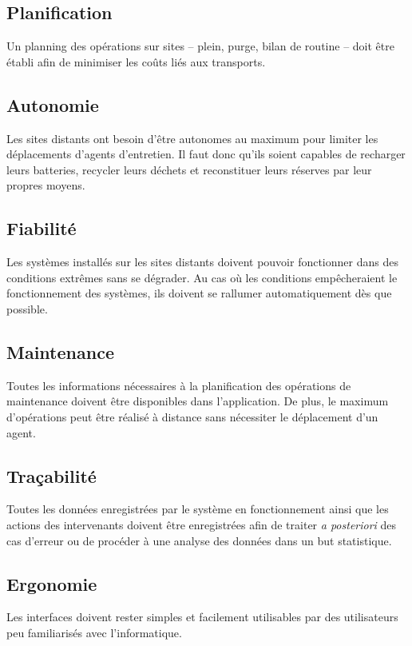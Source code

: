 \documentclass[a4paper, 11pt]{article}
\begin{document}
    \subsection{Planification} %
         Un planning des opérations sur sites -- plein, purge, bilan de routine --
doit être établi afin de minimiser les coûts liés aux transports.

    \subsection{Autonomie} %
        Les sites distants ont besoin d'être autonomes au maximum pour limiter les déplacements d'agents d'entretien. Il faut donc qu'ils soient capables de recharger leurs batteries, recycler leurs déchets et reconstituer leurs réserves par leur propres moyens.

    \subsection{Fiabilité} %
        Les systèmes installés sur les sites distants doivent pouvoir fonctionner dans des conditions extrêmes sans se dégrader. Au cas où les conditions empêcheraient le fonctionnement des systèmes, ils doivent se rallumer automatiquement dès que possible.

    \subsection{Maintenance} %
        Toutes les informations nécessaires à la planification des opérations de maintenance doivent être disponibles dans l'application. De plus, le maximum d'opérations peut être réalisé à distance sans nécessiter le déplacement d'un agent.

    \subsection{Traçabilité} %
        Toutes les données enregistrées par le système en fonctionnement ainsi que les actions des intervenants doivent être enregistrées afin de traiter \textit{a posteriori} des cas d'erreur ou de procéder à une analyse des données dans un but statistique.

    \subsection{Ergonomie} %
        Les interfaces doivent rester simples et facilement utilisables par des utilisateurs peu familiarisés avec l'informatique.
\end{document}
